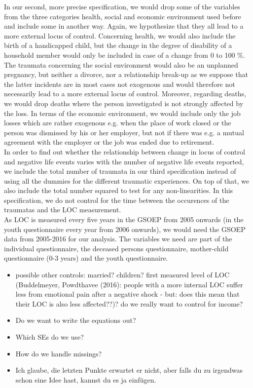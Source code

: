\documentclass[11pt,a4paper,leqno]{article}
\theoremstyle{definition}
\begin{document}
   In our second, more precise specification, we would drop some of the variables from the three categories health, social and economic environment used before and include some in another way. Again, we hypothesize that they all lead to a more external locus of control. Concerning health, we would also include the birth of a handicapped child, but the change in the degree of disability of a household member would only be included in case of a change from 0 to 100 \%. The traumata concerning the social environment would also be an unplanned pregnancy, but neither a divorce, nor a relationship break-up as we suppose that the latter incidents are in most cases not exogenous and would therefore not necessarily lead to a more external locus of control. Moreover, regarding deaths, we would drop deaths where the person investigated is not strongly affected by the loss. In terms of the economic environment, we would include only the job losses which are rather exogenous e.g. when the place of work closed or the person was dismissed by his or her employer, but not if there was e.g. a mutual agreement with the employer or the job was ended due to retirement.    \\
   
   In order to find out whether the relationship between change in locus of control and negative life events varies with the number of negative life events reported, we include the total number of traumata in our third specification instead of using all the dummies for the different traumatic experiences. On top of that, we also include the total number squared to test for any non-linearities. In this specification, we do not control for the time between the occurences of the traumatas and the LOC measurement. \\
   
   As LOC is measured every five years in the GSOEP from 2005 onwards (in the youth questionnaire every year from 2006 onwards), we would need the GSOEP data from 2005-2016 for our analysis. The variables we need are part of the individual questionnaire, the deceased persons questionnaire, mother-child questionnaire (0-3 years) and the youth questionnaire. 
   
   \begin{itemize}
   	\item possible other controls: married? children? first measured level of LOC (Buddelmeyer, Powdthavee (2016): people with a more internal LOC suffer less from emotional pain after a negative shock - but: does this mean that their LOC is also less affected??)? do we really want to control for income? 
   	\item Do we want to write the equations out? 
   	\item Which SEs do we use?
   	\item How do we handle missings?
   	\item Ich glaube, die letzten Punkte erwartet er nicht, aber falls du zu irgendwas schon eine Idee hast, kannst du es ja einfügen. 
   \end{itemize}
\end{document}
